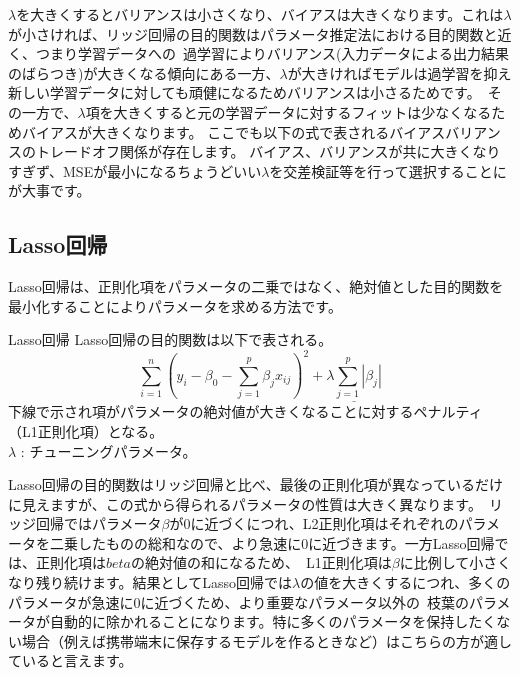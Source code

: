 \documentclass[uplatex]{jsarticle}
\begin{document}
$\lambda$を大きくするとバリアンスは小さくなり、バイアスは大きくなります。これは$\lambda$が小さければ、リッジ回帰の目的関数はパラメータ推定法における目的関数と近く、つまり学習データへの\
過学習によりバリアンス(入力データによる出力結果のばらつき)が大きくなる傾向にある一方、$\lambda$が大きければモデルは過学習を抑え新しい学習データに対しても頑健になるためバリアンスは小さるためです。\
その一方で、$\lambda$項を大きくすると元の学習データに対するフィットは少なくなるためバイアスが大きくなります。
ここでも以下の式で表されるバイアスバリアンスのトレードオフ関係が存在します。
バイアス、バリアンスが共に大きくなりすぎず、MSEが最小になるちょうどいい$\lambda$を交差検証等を行って選択することにが大事です。

\subsection{Lasso回帰}
Lasso回帰は、正則化項をパラメータの二乗ではなく、絶対値とした目的関数を最小化することによりパラメータを求める方法です。
\begin{itembox}[l]{Lasso回帰}
  Lasso回帰の目的関数は以下で表される。
  $$\sum_{i=1}^n \left(y_i - \beta_0 - \sum_{j=1}^p \beta_jx_{ij}\right)^2 + \underline{\lambda \sum_{j=1}^p |\beta_j|}$$
下線で示され項がパラメータの絶対値が大きくなることに対するペナルティ（L1正則化項）となる。\\
$\lambda$ : チューニングパラメータ。
\end{itembox}

Lasso回帰の目的関数はリッジ回帰と比べ、最後の正則化項が異なっているだけに見えますが、この式から得られるパラメータの性質は大きく異なります。\
リッジ回帰ではパラメータ$\beta$が0に近づくにつれ、L2正則化項はそれぞれのパラメータを二乗したものの総和なので、より急速に0に近づきます。一方Lasso回帰では、正則化項は$beta$の絶対値の和になるため、\
L1正則化項は$\beta$に比例して小さくなり残り続けます。結果としてLasso回帰では$\lambda$の値を大きくするにつれ、多くのパラメータが急速に0に近づくため、より重要なパラメータ以外の\
枝葉のパラメータが自動的に除かれることになります。特に多くのパラメータを保持したくない場合（例えば携帯端末に保存するモデルを作るときなど）はこちらの方が適していると言えます。\
\end{document}

